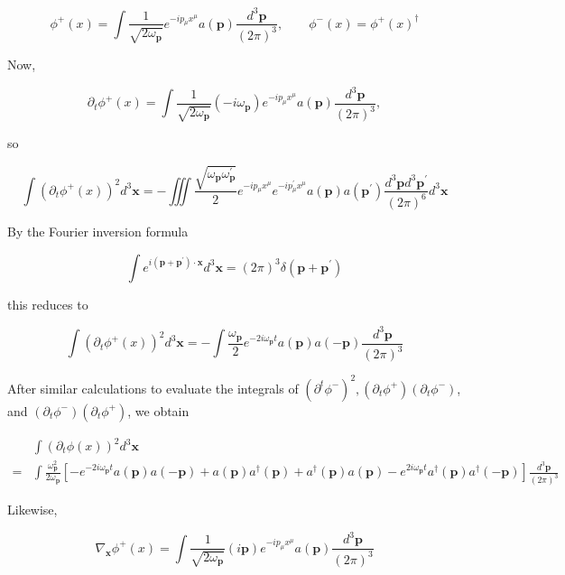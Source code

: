\documentclass[10pt, letterpaper]{article}
\begin{document}
$$
\phi^{+}(x)=\int \frac{1}{\sqrt{2 \omega_{\mathbf{p}}}} e^{-i p_{\mu} x^{\mu}} a(\mathbf{p}) \frac{d^{3} \mathbf{p}}{(2 \pi)^{3}}, \quad \quad \phi^{-}(x)=\phi^{+}(x)^{\dagger}
$$

Now,

$$
\partial_{t} \phi^{+}(x)=\int \frac{1}{\sqrt{2 \omega_{\mathbf{p}}}}\left(-i \omega_{\mathbf{p}}\right) e^{-i p_{\mu} x^{\mu}} a(\mathbf{p}) \frac{d^{3} \mathbf{p}}{(2 \pi)^{3}},
$$

so

$$
\int\left(\partial_{t} \phi^{+}(x)\right)^{2} d^{3} \mathbf{x}=-\iiint \frac{\sqrt{\omega_{\mathbf{p}} \omega_{\mathbf{p}}^{\prime}}}{2} e^{-i p_{\mu} x^{\mu}} e^{-i p_{\mu}^{\prime} x^{\mu}} a(\mathbf{p}) a\left(\mathbf{p}^{\prime}\right) \frac{d^{3} \mathbf{p} d^{3} \mathbf{p}^{\prime}}{(2 \pi)^{6}} d^{3} \mathbf{x}
$$

By the Fourier inversion formula

$$
\int e^{i\left(\mathbf{p}+\mathbf{p}^{\prime}\right) \cdot \mathbf{x}} d^{3} \mathbf{x}=(2 \pi)^{3} \delta\left(\mathbf{p}+\mathbf{p}^{\prime}\right)
$$

this reduces to

$$
\int\left(\partial_{t} \phi^{+}(x)\right)^{2} d^{3} \mathbf{x}=-\int \frac{\omega_{\mathbf{p}}}{2} e^{-2 i \omega_{\mathbf{p}} t} a(\mathbf{p}) a(-\mathbf{p}) \frac{d^{3} \mathbf{p}}{(2 \pi)^{3}}
$$

After similar calculations to evaluate the integrals of $\left(\partial^{t} \phi^{-}\right)^{2},\left(\partial_{t} \phi^{+}\right)\left(\partial_{t} \phi^{-}\right)$, and $\left(\partial_{t} \phi^{-}\right)\left(\partial_{t} \phi^{+}\right)$, we obtain

$$
\begin{aligned}
& \int\left(\partial_{t} \phi(x)\right)^{2} d^{3} \mathbf{x} \\
= & \int \frac{\omega_{\mathbf{p}}^{2}}{2 \omega_{\mathbf{p}}}\left[-e^{-2 i \omega_{\mathbf{p}} t} a(\mathbf{p}) a(-\mathbf{p})+a(\mathbf{p}) a^{\dagger}(\mathbf{p})+a^{\dagger}(\mathbf{p}) a(\mathbf{p})-e^{2 i \omega_{\mathbf{p}} t} a^{\dagger}(\mathbf{p}) a^{\dagger}(-\mathbf{p})\right] \frac{d^{3} \mathbf{p}}{(2 \pi)^{3}}
\end{aligned}
$$

Likewise,

$$
\nabla_{\mathbf{x}} \phi^{+}(x)=\int \frac{1}{\sqrt{2 \omega_{\mathbf{p}}}}(i \mathbf{p}) e^{-i p_{\mu} x^{\mu}} a(\mathbf{p}) \frac{d^{3} \mathbf{p}}{(2 \pi)^{3}}
$$
\end{document}
